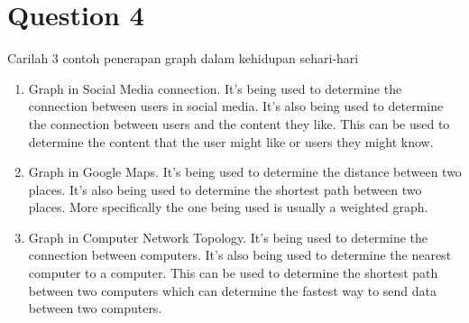 \documentclass[12pt,titlepage]{article}
\begin{document}
\begin{enumerate}[label=\alph*.)]
{\begin{center}
        \end{center}
    }
\end{enumerate}

\pagebreak

\section{Question 4}
Carilah 3 contoh penerapan graph dalam kehidupan sehari-hari

\begin{enumerate}
    \item {
        Graph in Social Media connection. It's being used to determine the
        connection between users in social media. It's also being used to
        determine the connection between users and the content they like.
        This can be used to determine the content that the user might like
        or users they might know.
    }
    \item {
        Graph in Google Maps. It's being used to determine the distance
        between two places. It's also being used to determine the shortest
        path between two places. More specifically the one being used is usually a
        weighted graph.
    }
    \item {
        Graph in Computer Network Topology. It's being used to determine the
        connection between computers. It's also being used to determine the
        nearest computer to a computer. This can be used to determine the
        shortest path between two computers which can determine the fastest
        way to send data between two computers.
    }
\end{enumerate}
\end{document}
